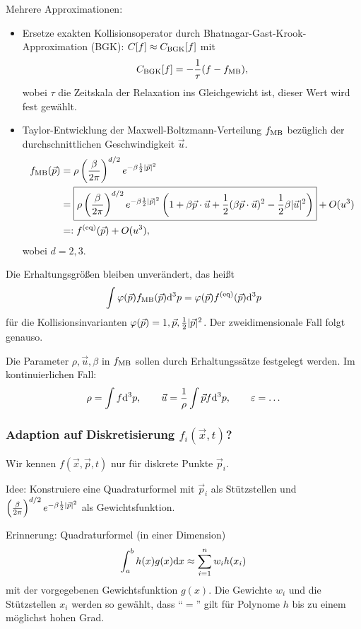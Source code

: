 Mehrere Approximationen:
\begin{itemize}
\item Ersetze exakten Kollisionsoperator durch
  Bhatnagar-Gast-Krook-Approximation (BGK): $C[f] \approx C_{\operatorname{BGK}}[f]$ mit
  \[ C_{\operatorname{BGK}}[f] = - \frac{1}{\tau} (f - f_{\operatorname{MB}}), \]
  wobei $\tau$ die Zeitskala der Relaxation ins Gleichgewicht ist, dieser
  Wert wird fest gewählt.
\item Taylor-Entwicklung der Maxwell-Boltzmann-Verteilung $f_{\operatorname{MB}}$
  bezüglich der durchschnittlichen Geschwindigkeit $\vec{u}$.
  \begin{align*}
    f_{\operatorname{MB}}(\vec{p})
    &= \rho \left( \frac{\beta}{2\pi} \right)^{d/2}
      e^{-\beta \frac{1}{2} |\vec{p}|^2} \\
    &= \boxed{
      \rho \left( \frac{\beta}{2\pi} \right)^{d/2}
      e^{-\beta \frac{1}{2} |\vec{p}|^2}
      \left(
      1 + \beta \vec{p} \cdot \vec{u}
      + \frac{1}{2} (\beta \vec{p} \cdot \vec{u})^2
      - \frac{1}{2} \beta |\vec{u}|^2
      \right)
      } + O(u^3) \\
    &=: f^{(\text{eq})}(\vec{p}) + O(u^3),
  \end{align*}
  wobei $d = 2,3$.
\end{itemize}
Die Erhaltungsgrößen bleiben unverändert, das heißt
\[ \int \varphi(\vec{p}) f_{\operatorname{MB}}(\vec{p}) \mathrm{d}^3 p
  = \varphi(\vec{p}) f^{(\text{eq})}(\vec{p}) \mathrm{d}^3 p \]
für die Kollisionsinvarianten $\varphi(\vec{p}) = 1,
\vec{p}, \frac{1}{2} |\vec{p}|^2$. Der zweidimensionale Fall folgt genauso.

Die Parameter $\rho, \vec{u}, \beta$ in $f_{\operatorname{MB}}$ sollen durch
Erhaltungssätze festgelegt werden. Im konti\-nuierlichen Fall:
\[ \rho = \int f \mathrm{d}^3 p, \qquad
  \vec{u} = \frac{1}{\rho} \int \vec{p} f \mathrm{d}^3 p, \qquad
  \varepsilon = \ldots \]

\subsubsection*{Adaption auf Diskretisierung $f_i(\vec{x},t)$?} Wir kennen
$f(\vec{x}, \vec{p}, t)$ nur für diskrete Punkte $\vec{p}_i$.

Idee: Konstruiere eine Quadraturformel mit $\vec{p}_i$ als Stützstellen und
$\left( \frac{\beta}{2\pi} \right)^{d/2} e^{-\beta \frac{1}{2} |\vec{p}|^2}$
als Gewichtsfunktion.

Erinnerung: Quadraturformel (in einer Dimension)
\[ \int_a^b h(x) g(x) \mathrm{d} x \approx
  \sum_{i=1}^n w_i h(x_i) \]
mit der vorgegebenen Gewichtsfunktion $g(x)$. Die Gewichte $w_i$ und die
Stützstellen $x_i$ werden so gewählt, dass ``$=$'' gilt für Polynome $h$
bis zu einem möglichst hohen Grad.

